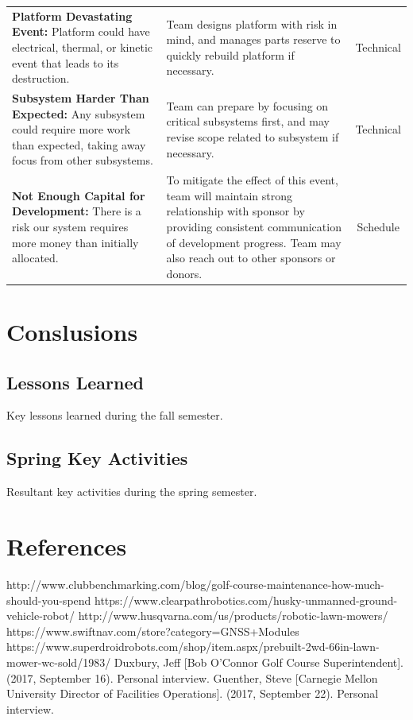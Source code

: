 \documentclass[12pt]{extarticle}
\begin{document}
\begin{table}[H]
\begin{tabular}{p{7cm}p{6cm}c}
 \textbf{Platform Devastating Event:} 
Platform could have electrical, thermal, or kinetic event that leads to its destruction.
&
Team designs platform with risk in mind, and manages parts reserve to quickly rebuild platform if necessary.
&
Technical\\

 \textbf{Subsystem Harder Than Expected:} 
Any subsystem could require more work than expected, taking away focus from other subsystems.
&
Team can prepare by focusing on critical subsystems first, and may revise scope related to subsystem if necessary.
&
Technical\\

\textbf{Not Enough Capital for Development:} 
There is a risk our system requires more money than initially allocated.
&
To mitigate the effect of this event, team will maintain strong relationship with sponsor by providing consistent communication of development progress. Team may also reach out to other sponsors or donors.
&
Schedule\\
\end{tabular}
\end{table}

\section{Conslusions}
\subsection{Lessons Learned}
Key lessons learned during the fall semester.
\subsection{Spring Key Activities}
Resultant key activities during the spring semester.

\begingroup
\newpage
\section{References}
\renewcommand{\section}[2]{}%
\begin{thebibliography}{}
http://www.clubbenchmarking.com/blog/golf-course-maintenance-how-much-should-you-spend
https://www.clearpathrobotics.com/husky-unmanned-ground-vehicle-robot/
http://www.husqvarna.com/us/products/robotic-lawn-mowers/
https://www.swiftnav.com/store?category=GNSS+Modules
https://www.superdroidrobots.com/shop/item.aspx/prebuilt-2wd-66in-lawn-mower-wc-sold/1983/
Duxbury, Jeff [Bob O’Connor Golf Course Superintendent]. (2017, September 16). Personal interview.
Guenther, Steve [Carnegie Mellon University Director of Facilities Operations]. (2017, September 22). Personal interview.
\end{thebibliography}
\endgroup
\end{document}
